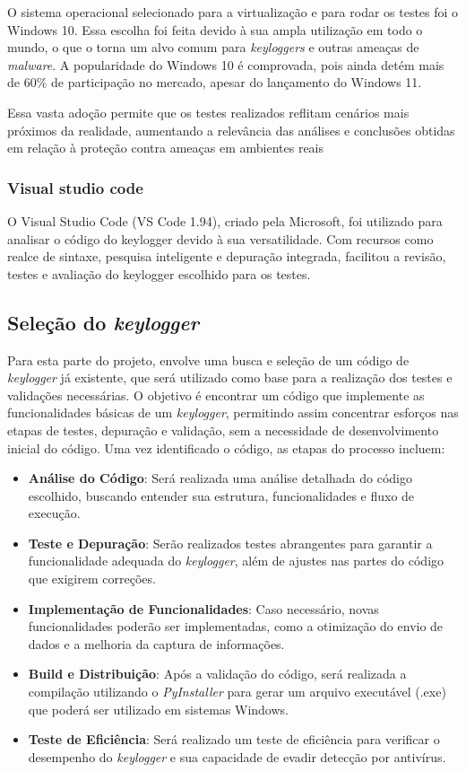 \documentclass[12pt]{article}
\begin{document}
O sistema operacional selecionado para a virtualização e para rodar os testes foi o Windows 10. Essa escolha foi feita devido à sua ampla utilização em todo o mundo, o que o torna um alvo comum para \textit{keyloggers} e outras ameaças de \textit{malware}. A popularidade do Windows 10 é comprovada, pois ainda detém mais de 60\% de participação no mercado, apesar do lançamento do Windows 11. \citep{tomshardware2023}

Essa vasta adoção permite que os testes realizados reflitam cenários mais próximos da realidade, aumentando a relevância das análises e conclusões obtidas em relação à proteção contra ameaças em ambientes reais

\subsubsection{Visual studio code}
O Visual Studio Code (VS Code 1.94), criado pela Microsoft, foi utilizado para analisar o código do keylogger devido à sua versatilidade. Com recursos como realce de sintaxe, pesquisa inteligente e depuração integrada, facilitou a revisão, testes e avaliação do keylogger escolhido para os testes.

\subsection{Seleção do \textit{keylogger}}
Para esta parte do projeto, envolve uma busca e seleção de um código de \textit{keylogger} já existente, que será utilizado como base para a realização dos testes e validações necessárias. O objetivo é encontrar um código que implemente as funcionalidades básicas de um \textit{keylogger}, permitindo assim concentrar esforços nas etapas de testes, depuração e validação, sem a necessidade de desenvolvimento inicial do código. Uma vez identificado o código, as etapas do processo incluem:

\begin{itemize}
    \item \textbf{Análise do Código}: Será realizada uma análise detalhada do código escolhido, buscando entender sua estrutura, funcionalidades e fluxo de execução.
    \item \textbf{Teste e Depuração}: Serão realizados testes abrangentes para garantir a funcionalidade adequada do \textit{keylogger}, além de ajustes nas partes do código que exigirem correções.
    \item \textbf{Implementação de Funcionalidades}: Caso necessário, novas funcionalidades poderão ser implementadas, como a otimização do envio de dados e a melhoria da captura de informações.
    \item \textbf{Build e Distribuição}: Após a validação do código, será realizada a compilação utilizando o \textit{PyInstaller} para gerar um arquivo executável (.exe) que poderá ser utilizado em sistemas Windows.
    \item \textbf{Teste de Eficiência}: Será realizado um teste de eficiência para verificar o desempenho do \textit{keylogger} e sua capacidade de evadir detecção por antivírus.
\end{itemize}
\end{document}
